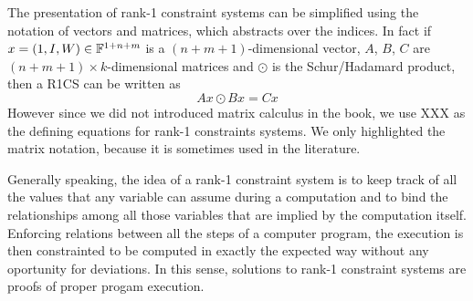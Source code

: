 \begin{remark} The presentation of rank-1 constraint systems can be simplified using the notation of vectors and matrices, which abstracts over the indices. In fact if
$x= (1,I,W)\in \mathbb{F}^{1+n+m}$ is a $(n+m+1)$-dimensional vector, $A$, $B$, $C$ are $(n+m+1)\times k$-dimensional matrices and $\odot$ is the Schur/Hadamard product, then a R1CS can be written as
$$
Ax \odot Bx = Cx
$$
However since we did not introduced matrix calculus in the book, we use XXX as the defining equations for rank-1 constraints systems. We only highlighted the matrix notation, because it is sometimes used in the literature.
\end{remark}
Generally speaking, the idea of a rank-1 constraint system is to keep track of all the values that any variable can assume during a computation and to bind the relationships among all those variables that are implied by the computation itself. Enforcing relations between all the steps of a computer program, the execution is then constrainted to be computed in exactly the expected way without any oportunity for deviations. In this sense, solutions to rank-1 constraint systems are proofs of proper progam execution.
